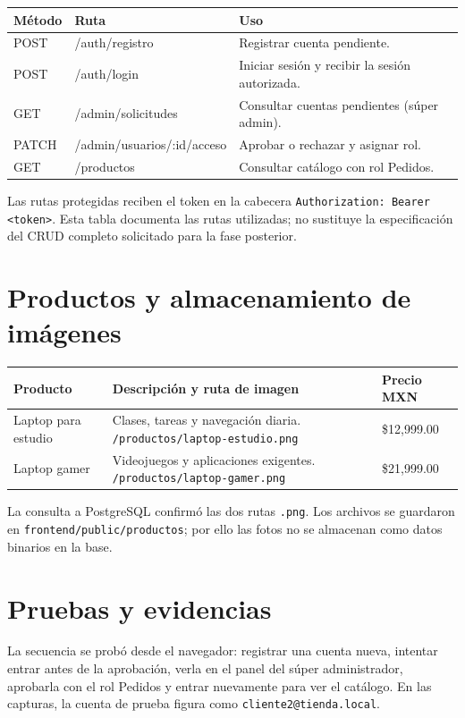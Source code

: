 \documentclass[11pt,letterpaper]{article}
\begin{document}
\begin{tabularx}{\textwidth}{>{\ttfamily\small}p{1.45cm}>{\ttfamily\small}p{6.1cm}X}
\toprule
\textbf{Método} & \textbf{Ruta} & \textbf{Uso}\\ \midrule
POST & /auth/registro & Registrar cuenta pendiente.\\
POST & /auth/login & Iniciar sesión y recibir la sesión autorizada.\\
GET & /admin/solicitudes & Consultar cuentas pendientes (súper admin).\\
PATCH & /admin/usuarios/:id/acceso & Aprobar o rechazar y asignar rol.\\
GET & /productos & Consultar catálogo con rol Pedidos.\\
\bottomrule
\end{tabularx}

Las rutas protegidas reciben el token en la cabecera \texttt{Authorization: Bearer <token>}. Esta tabla documenta las rutas utilizadas; no sustituye la especificación del CRUD completo solicitado para la fase posterior.

\section{Productos y almacenamiento de imágenes}
\begin{tabularx}{\textwidth}{>{\raggedright\arraybackslash}p{3.5cm}X>{\raggedleft\arraybackslash}p{2.6cm}}
\toprule
\textbf{Producto} & \textbf{Descripción y ruta de imagen} & \textbf{Precio MXN}\\ \midrule
Laptop para estudio & Clases, tareas y navegación diaria. \texttt{/productos/laptop-estudio.png} & \$12,999.00\\
Laptop gamer & Videojuegos y aplicaciones exigentes. \texttt{/productos/laptop-gamer.png} & \$21,999.00\\
\bottomrule
\end{tabularx}

La consulta a PostgreSQL confirmó las dos rutas \texttt{.png}. Los archivos se guardaron en \nolinkurl{frontend/public/productos}; por ello las fotos no se almacenan como datos binarios en la base.

\clearpage
\section{Pruebas y evidencias}
La secuencia se probó desde el navegador: registrar una cuenta nueva, intentar entrar antes de la aprobación, verla en el panel del súper administrador, aprobarla con el rol Pedidos y entrar nuevamente para ver el catálogo. En las capturas, la cuenta de prueba figura como \texttt{cliente2@tienda.local}.
\end{document}

